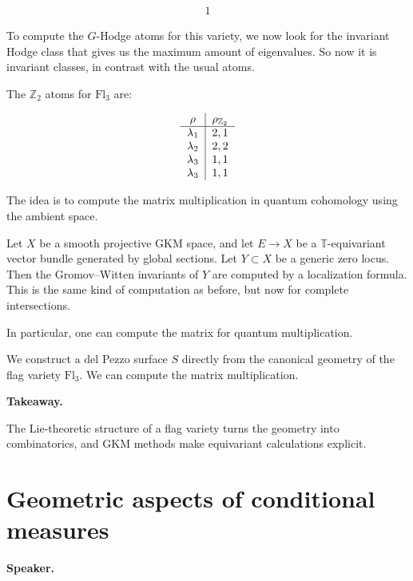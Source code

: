 \[
\begin{matrix}
1
\end{matrix}
\]

To compute the $G$-Hodge atoms for this
variety, we now look for the invariant
Hodge class that gives us the maximum
amount of eigenvalues.
So now it is invariant classes, in
contrast with the usual atoms.

The $\mathbb{Z}_2$ atoms for
\(\mathrm{Fl}_3\) are:

\[
\begin{tabular}{c|c}
$\rho$ & $\rho_{\mathbb{Z}_2}$ \\
\hline
$\lambda_1$ & $2,1$ \\
$\lambda_2$ & $2,2$ \\
$\lambda_3$ & $1,1$ \\
$\lambda_3$ & $1,1$
\end{tabular}
\]

The idea is to compute the matrix
multiplication in quantum cohomology
using the ambient space.

\begin{theorem}
\label{theorem-let-x5-duplicate-2}
Let $X$ be a smooth projective GKM
space, and let
$E\to X$ be a $\mathbb{T}$-equivariant
vector bundle generated by global
sections.
Let $Y\subset X$ be a generic zero
locus.
Then the Gromov--Witten invariants of
$Y$ are computed by a localization
formula.
This is the same kind of computation as
before, but now for complete
intersections.

In particular, one can compute the
matrix for quantum multiplication.
\end{theorem}

\begin{example}
\label{example-construct-del}
We construct a del Pezzo surface $S$
directly from the canonical geometry of
the flag variety $\mathrm{Fl}_3$.
We can compute the matrix
multiplication.
\end{example}

\medskip\noindent
{\bf Takeaway.}

The Lie-theoretic structure of a flag
variety turns the geometry into
combinatorics, and GKM methods make
equivariant calculations explicit.

\section{Geometric aspects of
conditional measures}
\label{label-hodge-birational}

\medskip\noindent
{\bf Speaker.}

